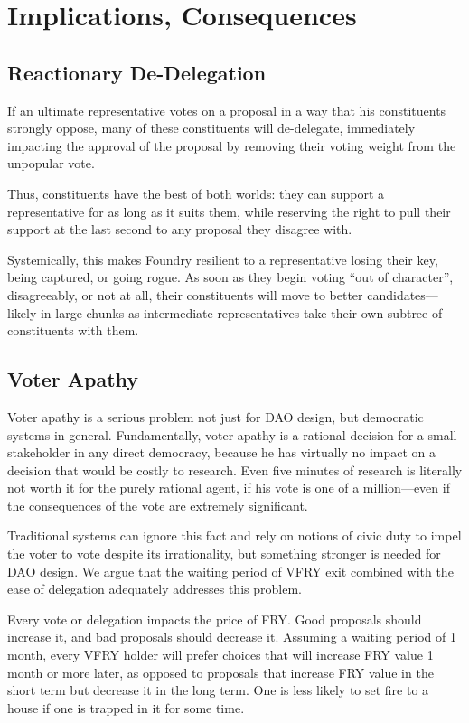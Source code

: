 \documentclass{article}
\begin{document}
\section{Implications, Consequences} \label{implications}

\subsection{Reactionary De-Delegation} \label{reactionary-dedelegation}

If an ultimate representative votes on a proposal in a way that his constituents strongly oppose, many of these constituents will de-delegate, immediately impacting the approval of the proposal by removing their voting weight from the unpopular vote.

Thus, constituents have the best of both worlds: they can support a representative for as long as it suits them, while reserving the right to pull their support at the last second to any proposal they disagree with.

Systemically, this makes Foundry resilient to a representative losing their key, being captured, or going rogue. As soon as they begin voting ``out of character'', disagreeably, or not at all, their constituents will move to better candidates---likely in large chunks as intermediate representatives take their own subtree of constituents with them.

\subsection{Voter Apathy} \label{voter-apathy}

Voter apathy is a serious problem not just for DAO design, but democratic systems in general. Fundamentally, voter apathy is a rational decision for a small stakeholder in any direct democracy, because he has virtually no impact on a decision that would be costly to research. Even five minutes of research is literally not worth it for the purely rational agent, if his vote is one of a million---even if the consequences of the vote are extremely significant.

Traditional systems can ignore this fact and rely on notions of civic duty to impel the voter to vote despite its irrationality, but something stronger is needed for DAO design. We argue that the waiting period of VFRY exit combined with the ease of delegation adequately addresses this problem.

Every vote or delegation impacts the price of FRY. Good proposals should increase it, and bad proposals should decrease it. Assuming a waiting period of 1 month, every VFRY holder will prefer choices that will increase FRY value 1 month or more later, as opposed to proposals that increase FRY value in the short term but decrease it in the long term. One is less likely to set fire to a house if one is trapped in it for some time.
\end{document}
